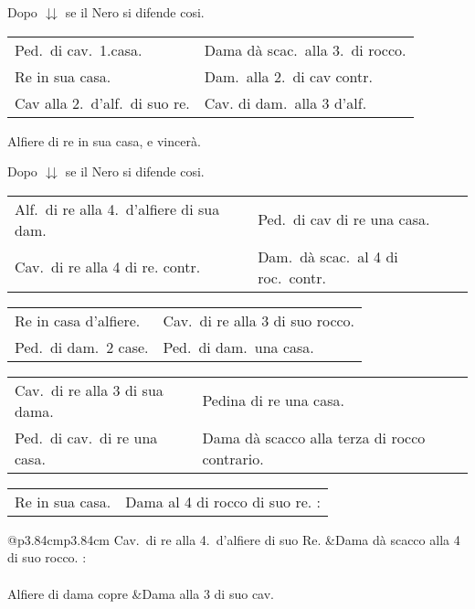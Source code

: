 \documentclass[11pt,a6paper]{article}
\newcommand{\markerC}{{\small$\downarrow$}}
\newcommand{\markerB}{{\small$\downdownarrows$}}
\begin{document}
Dopo \markerB{} se il Nero si difende cosi.

{\small\noindent\begin{tabular}{@{}p{3.84cm}p{3.84cm}}
Ped.\ di cav.\ 1.casa. &Dama dà scac.\ alla 3.\ di rocco. \\
Re in sua casa.&Dam.\ alla 2.\ di cav contr.\\
Cav alla 2.\ d'alf.\ di suo re.&Cav. di dam.\ alla 3 d'alf.\\
\end{tabular}}

Alfiere di re in sua casa, e vincerà.

Dopo \markerB{} se il Nero si difende cosi.

{\small\noindent\begin{tabular}{@{}p{3.84cm}p{3.84cm}}
Alf.\ di re alla 4.\ d'alfiere di sua dam.&Ped.\ di cav di re una casa. \\
Cav.\ di re alla 4 di re. contr. &Dam.\ dà scac.\ al 4 di roc.\ contr.\\
 \end{tabular}

\noindent\begin{tabular}{@{}p{3.84cm}p{3.84cm}}
Re in casa d'alfiere. &Cav.\ di re alla 3 di suo rocco.\\
Ped.\ di dam.\ 2 case. &Ped.\ di dam.\ una casa.\\
 \end{tabular}

\noindent\begin{tabular}{@{}p{3.84cm}p{3.84cm}}
Cav.\ di re alla 3 di sua dama.&Pedina di re una casa.\\
Ped.\ di cav.\ di re una casa. &Dama dà scacco alla terza di rocco contrario.\\
 \end{tabular}

\noindent\begin{tabular}{@{}p{3.84cm}p{3.84cm}}
Re in sua casa. &Dama al 4 di rocco di suo re. :\\
 \end{tabular}

\noindent\begin{tabular}{@{}p{3.84cm}p{3.84cm}}
Cav.\ di re alla 4.\ d'alfiere di suo Re. &Dama dà scacco alla 4 di suo rocco. :\\
\multicolumn{2}{@{}c}{\markerC}\\
Alfiere di dama copre &Dama alla 3 di suo cav.\\
 \end{tabular}

}
\end{document}
